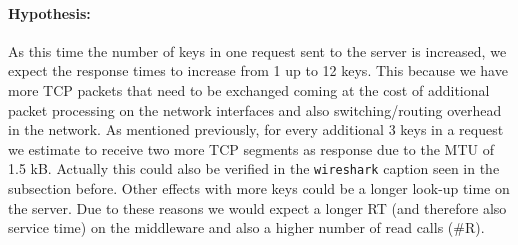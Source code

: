 \documentclass[11pt,a4paper]{article}
\let\tt\texttt
\begin{document}
\paragraph{Hypothesis: }
As this time the number of keys in one request sent to the server is increased, we expect the response times to increase from 1 up to 12 keys. This because we have more TCP packets that need to be exchanged coming at the cost of additional packet processing on the network interfaces and also switching/routing overhead in the network. As mentioned previously, for every additional 3 keys in a request we estimate to receive two more TCP segments as response due to the MTU of 1.5 kB. Actually this could also be verified in the \tt{wireshark} caption seen in the subsection before. Other effects with more keys could be a longer look-up time on the server. Due to these reasons we would expect a longer RT (and therefore also service time) on the middleware and also a higher number of read calls (\#R).
\end{document}

